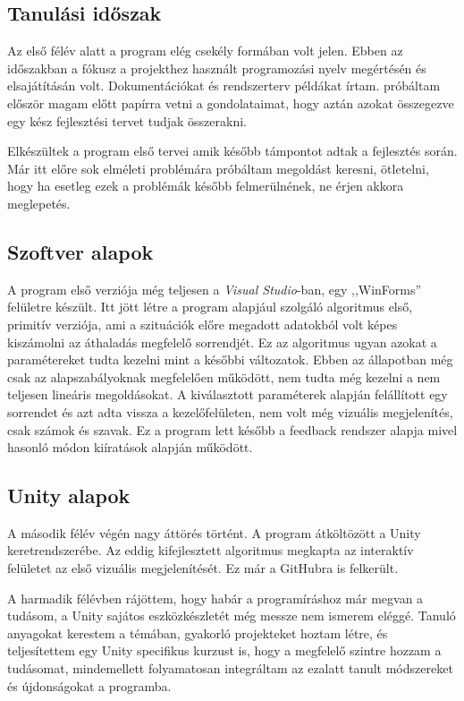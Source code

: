 \documentclass[
]{thesis-ekf}
\theoremstyle{definition}
\theoremstyle{remark}
\begin{document}
\subsection{Tanulási időszak}
Az első félév alatt a program elég csekély formában volt jelen. Ebben az időszakban a fókusz a projekthez használt programozási nyelv megértésén és elsajátításán volt. Dokumentációkat és rendszerterv példákat írtam. próbáltam először magam előtt papírra vetni a gondolataimat, hogy aztán azokat összegezve egy kész fejlesztési tervet tudjak összerakni.

Elkészültek a program első tervei amik később támpontot adtak a fejlesztés során. Már itt előre sok elméleti problémára próbáltam megoldást keresni, ötletelni, hogy ha esetleg ezek a problémák később felmerülnének, ne érjen akkora meglepetés.
\subsection{Szoftver alapok}
A program első verziója még teljesen a \textit{Visual Studio}-ban, egy ,,WinForms'' felületre készült. Itt jött létre a program alapjául szolgáló algoritmus első, primitív verziója, ami a szituációk előre megadott adatokból volt képes kiszámolni az áthaladás megfelelő sorrendjét. Ez az algoritmus ugyan azokat a paramétereket tudta kezelni mint a későbbi változatok. Ebben az állapotban még csak az alapszabályoknak megfelelően működött, nem tudta még kezelni a nem teljesen lineáris megoldásokat. A kiválasztott paraméterek alapján felállított egy sorrendet és azt adta vissza a kezelőfelületen, nem volt még vizuális megjelenítés, csak számok és szavak. Ez a program lett később a feedback rendszer alapja mivel hasonló módon kiíratások alapján működött.
\subsection{Unity alapok}
A második félév végén nagy áttörés történt. A program átköltözött a Unity keretrendszerébe. Az eddig kifejlesztett algoritmus megkapta az interaktív felületet az első vizuális megjelenítését. Ez már a GitHubra is felkerült.

A harmadik félévben rájöttem, hogy habár a programíráshoz már megvan a tudásom, a Unity sajátos eszközkészletét még messze nem ismerem eléggé. Tanuló anyagokat kerestem a témában, gyakorló projekteket hoztam létre, és teljesítettem egy Unity specifikus kurzust is, hogy a megfelelő szintre hozzam a tudásomat, mindemellett folyamatosan integráltam az ezalatt tanult módszereket és újdonságokat a programba. 
\end{document}

